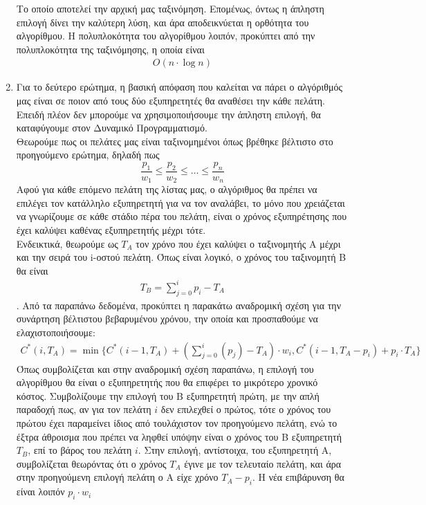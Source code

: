 \documentclass{article}
\begin{document}
\begin{enumerate}
Το οποίο αποτελεί την αρχική μας ταξινόμηση. Επομένως, όντως η άπληστη επιλογή δίνει την καλύτερη λύση, και άρα αποδεικνύεται η ορθότητα του αλγορίθμου. Η πολυπλοκότητα του αλγορίθμου λοιπόν, προκύπτει από την πολυπλοκότητα της ταξινόμησης, η οποία είναι 
\begin{align*}
O(n \cdot \log n) 
\end{align*}

	\item Για το δεύτερο ερώτημα, η βασική απόφαση που καλείται να πάρει ο αλγόριθμός μας είναι σε ποιον από τους δύο εξυπηρετητές θα αναθέσει την κάθε πελάτη. Επειδή πλέον δεν μπορούμε να χρησιμοποιήσουμε την άπληστη επιλογή, θα καταφύγουμε στον Δυναμικό Προγραμματισμό. \\
Θεωρούμε πως οι πελάτες μας είναι ταξινομημένοι όπως βρέθηκε βέλτιστο στο προηγούμενο ερώτημα, δηλαδή πως 
$$
\frac{p_1}{w_1} \leq \frac{p_2}{w_2} \leq \ldots \leq \frac{p_n}{w_n}
$$
Αφού για κάθε επόμενο πελάτη της λίστας μας, ο αλγόριθμος θα πρέπει να επιλέγει τον κατάλληλο εξυπηρετητή για να τον αναλάβει, το μόνο που χρειάζεται να γνωρίζουμε σε κάθε στάδιο πέρα του πελάτη, είναι ο χρόνος εξυπηρέτησης που έχει καλύψει καθένας εξυπηρετητής μέχρι τότε. \\
Ενδεικτικά, θεωρούμε ως $T_A$ τον χρόνο που έχει καλύψει ο ταξινομητής Α μέχρι και την σειρά του i-οστού πελάτη. Όπως είναι λογικό, ο χρόνος του ταξινομητή Β θα είναι 
\begin{align*}
T_B = \sum_{j=0}^{i} p_i - T_A
\end{align*}. 
Από τα παραπάνω δεδομένα, προκύπτει η παρακάτω αναδρομική σχέση για την συνάρτηση βέλτιστου βεβαρυμένου χρόνου, την οποία και προσπαθούμε να ελαχιστοποιήσουμε:
\begin{align*}
C^{*}(i, T_A) = \min\{C^{*}(i-1, T_A) + (\sum_{j=0}^{i} (p_j) - T_A) \cdot w_i , C^{*}(i-1, T_A - p_i) + p_i \cdot T_A\}
\end{align*}
Όπως συμβολίζεται και στην αναδρομική σχέση παραπάνω, η επιλογή του αλγορίθμου θα είναι ο εξυπηρετητής που θα επιφέρει το μικρότερο χρονικό κόστος. Συμβολίζουμε την επιλογή του Β εξυπηρετητή πρώτη, με την απλή παραδοχή πως, αν για τον πελάτη $i$ δεν επιλεχθεί ο πρώτος, τότε ο χρόνος του πρώτου έχει παραμείνει ίδιος από τουλάχιστον τον προηγούμενο πελάτη, ενώ το έξτρα άθροισμα που πρέπει να ληφθεί υπόψην είναι ο χρόνος του Β εξυπηρετητή $T_B$, επί το βάρος του πελάτη $i$. Στην επιλογή, αντίστοιχα, του εξυπηρετητή Α, συμβολίζεται θεωρόντας ότι ο χρόνος $T_A$ έγινε με τον τελευταίο πελάτη, και άρα στην προηγούμενη επιλογή πελάτη ο Α είχε χρόνο $T_A - p_i$. Η νέα επιβάρυνση θα είναι λοιπόν $p_i\cdot w_i$


\end{enumerate}
\end{document}
